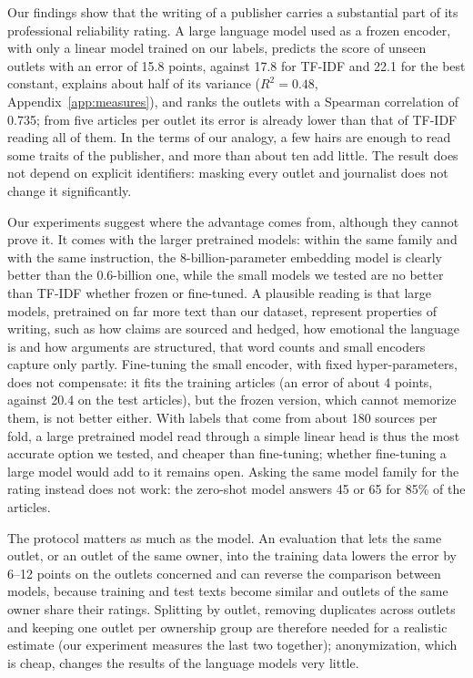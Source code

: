 \documentclass[11pt,a4paper]{article}
\begin{document}
Our findings show that the writing of a publisher carries a substantial part of its professional reliability rating.
A large language model used as a frozen encoder, with only a linear model trained on our labels, predicts the score of
unseen outlets with an error of 15.8 points, against 17.8 for TF-IDF and 22.1 for the best constant, explains about
half of its variance ($R^2 = 0.48$, Appendix~\ref{app:measures}), and ranks the outlets with a Spearman correlation of
0.735; from five articles per outlet its error is already lower than that of TF-IDF reading all of them. In the terms
of our analogy, a few hairs are enough to read some traits of the publisher, and more than about ten add little. The
result does not depend on explicit identifiers: masking every outlet and journalist does not change it significantly.

Our experiments suggest where the advantage comes from, although they cannot prove it. It comes with the larger pretrained models: within the same family and with the same instruction, the
8-billion-parameter embedding model is clearly better than the 0.6-billion one, while the small models we tested are no
better than TF-IDF whether frozen or fine-tuned. A plausible reading is that large models, pretrained on far more text than our dataset, represent
properties of writing, such as how claims are sourced and hedged, how emotional the language is and how arguments are
structured, that word counts and small encoders capture only partly. Fine-tuning the small encoder, with fixed hyper-parameters, does not compensate: it fits the training articles (an
error of about 4 points, against 20.4 on the test articles), but the frozen version, which cannot memorize them, is not
better either. With labels that come from about 180 sources per fold, a large pretrained model read through a simple
linear head is thus the most accurate option we tested, and cheaper than fine-tuning; whether fine-tuning a large model would
add to it remains open. Asking the same model family for the rating instead does not work: the zero-shot model
answers 45 or 65 for 85\% of the articles.

The protocol matters as much as the model. An evaluation that lets the same outlet, or an outlet of the same owner, into
the training data lowers the error by 6--12 points on the outlets concerned and can reverse the comparison between
models, because training and test texts become similar and outlets of the same owner share their ratings. Splitting by
outlet, removing duplicates across outlets and keeping one outlet per ownership group are therefore needed for a
realistic estimate (our experiment measures the last two together); anonymization, which is cheap, changes the results of the language models very little.
\end{document}
